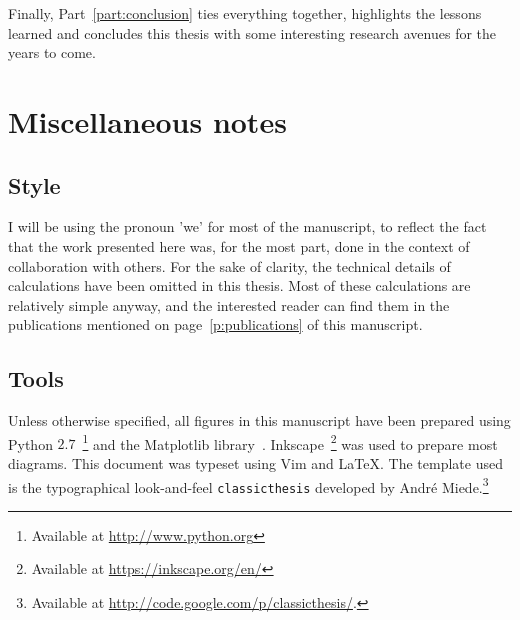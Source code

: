 Finally, Part~\ref{part:conclusion} ties everything together, highlights the lessons
learned and concludes this thesis with some interesting research avenues for the
years to come.



\section{Miscellaneous notes}

\subsection{Style}
\label{sub:style}

I will be using the pronoun 'we' for most of the manuscript, to reflect the fact
that the work presented here was, for the most part, done in the context of
collaboration with others. For the sake of clarity, the technical details of
calculations have been omitted in this thesis. Most of these calculations are
relatively simple anyway, and the interested reader can find them in the
publications mentioned on page~\ref{p:publications} of this manuscript.

\subsection{Tools}
\label{sub:tools}

Unless otherwise specified, all figures in this manuscript have been prepared
using Python $2.7$~\footnote{Available at \url{http://www.python.org}} and the
Matplotlib library~\cite{Hunter:2007}. Inkscape~\footnote{Available at
\url{https://inkscape.org/en/}} was used to prepare most diagrams. This document
was typeset using Vim and \LaTeX. The template used is the typographical look-and-feel
\texttt{classicthesis} developed by Andr\'e
Miede.\footnote{Available at 
\url{http://code.google.com/p/classicthesis/}.}

\begin{center}
\end{center}
